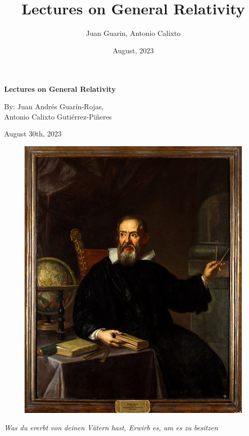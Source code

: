 \documentclass[11pt, letterpaper]{article}
\title{Lectures on General Relativity}
\author{Juan Guarin, Antonio Calixto}
\date{August, 2023}
\begin{document}
\begin{center}
	\huge \textbf{Lectures on General Relativity}
	
	\vspace{5mm}
	By: Juan Andrés Guarín-Rojas,\\
	Antonio Calixto Gutiérrez-Piñeres
	
	\vspace{5mm}
	August 30th, 2023
\end{center}
\vfill
\begin{figure}[hb]
	\centering
	\includegraphics[width=0.7\linewidth]{images/Galileo-Galilei.jpg}
\end{figure}
\vfill

\newpage

\textit{Was du ererbt von deinen Vätern hast, Erwirb es, um es zu besitzen}
\end{document}
